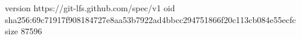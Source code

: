 version https://git-lfs.github.com/spec/v1
oid sha256:69c71917f908184727e8aa53b7922ad4bbcc294751866f20c113cb084e55ecfc
size 87596
